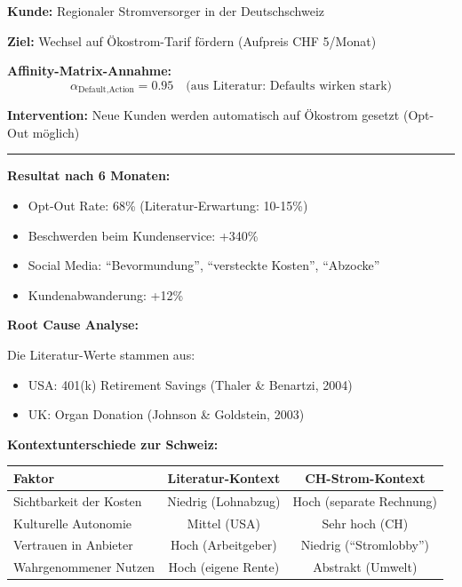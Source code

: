 \begin{tcolorbox}[colback=red!3!white, colframe=red!60!black,
    title=\textbf{Case Study 2: Der Stromversorger und die rebellischen Defaults}]

\textbf{Kunde:} Regionaler Stromversorger in der Deutschschweiz

\textbf{Ziel:} Wechsel auf Ökostrom-Tarif fördern (Aufpreis CHF 5/Monat)

\textbf{Affinity-Matrix-Annahme:}
\begin{equation*}
\alpha_{\text{Default}, \text{Action}} = 0.95 \quad \text{(aus Literatur: Defaults wirken stark)}
\end{equation*}

\textbf{Intervention:} Neue Kunden werden automatisch auf Ökostrom gesetzt (Opt-Out möglich)

\medskip
\hrule
\medskip

\textbf{Resultat nach 6 Monaten:}
\begin{itemize}[nosep]
    \item Opt-Out Rate: 68\% (Literatur-Erwartung: 10-15\%)
    \item Beschwerden beim Kundenservice: +340\%
    \item Social Media: ``Bevormundung'', ``versteckte Kosten'', ``Abzocke''
    \item Kundenabwanderung: +12\%
\end{itemize}

\textbf{Root Cause Analyse:}

Die Literatur-Werte stammen aus:
\begin{itemize}[nosep]
    \item USA: 401(k) Retirement Savings (Thaler \& Benartzi, 2004)
    \item UK: Organ Donation (Johnson \& Goldstein, 2003)
\end{itemize}

\textbf{Kontextunterschiede zur Schweiz:}
\begin{center}
\begin{tabular}{@{}lcc@{}}
\toprule
\textbf{Faktor} & \textbf{Literatur-Kontext} & \textbf{CH-Strom-Kontext} \\
\midrule
Sichtbarkeit der Kosten & Niedrig (Lohnabzug) & Hoch (separate Rechnung) \\
Kulturelle Autonomie & Mittel (USA) & Sehr hoch (CH) \\
Vertrauen in Anbieter & Hoch (Arbeitgeber) & Niedrig (``Stromlobby'') \\
Wahrgenommener Nutzen & Hoch (eigene Rente) & Abstrakt (Umwelt) \\
\bottomrule
\end{tabular}
\end{center}


\end{tcolorbox}
